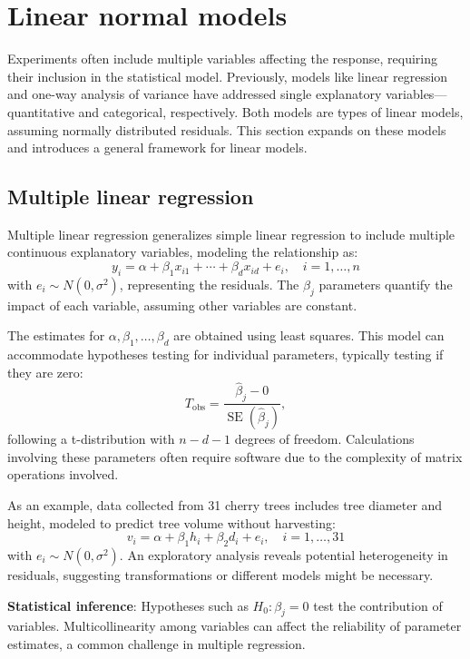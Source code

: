 \documentclass{article}
\begin{document}
\section{Linear normal models}

Experiments often include multiple variables affecting the response, requiring their inclusion in the statistical model. Previously, models like linear regression and one-way analysis of variance have addressed single explanatory variables—quantitative and categorical, respectively. Both models are types of linear models, assuming normally distributed residuals. This section expands on these models and introduces a general framework for linear models.

\subsection{Multiple linear regression}

Multiple linear regression generalizes simple linear regression to include multiple continuous explanatory variables, modeling the relationship as:
\[
y_i = \alpha + \beta_1 x_{i1} + \cdots + \beta_d x_{id} + e_i, \quad i = 1, \ldots, n
\]
with $e_i \sim N(0, \sigma^2)$, representing the residuals. The $\beta_j$ parameters quantify the impact of each variable, assuming other variables are constant.

The estimates for $\alpha, \beta_1, \ldots, \beta_d$ are obtained using least squares. This model can accommodate hypotheses testing for individual parameters, typically testing if they are zero:
\[
T_{\text{obs}} = \frac{\hat{\beta}_j - 0}{\operatorname{SE}(\hat{\beta}_j)},
\]
following a t-distribution with $n-d-1$ degrees of freedom. Calculations involving these parameters often require software due to the complexity of matrix operations involved.

As an example, data collected from 31 cherry trees includes tree diameter and height, modeled to predict tree volume without harvesting:
\[
v_i = \alpha + \beta_1 h_i + \beta_2 d_i + e_i, \quad i = 1, \ldots, 31
\]
with $e_i \sim N(0, \sigma^2)$. An exploratory analysis reveals potential heterogeneity in residuals, suggesting transformations or different models might be necessary.



\textbf{Statistical inference}: Hypotheses such as $H_0: \beta_j = 0$ test the contribution of variables. Multicollinearity among variables can affect the reliability of parameter estimates, a common challenge in multiple regression.
\end{document}
